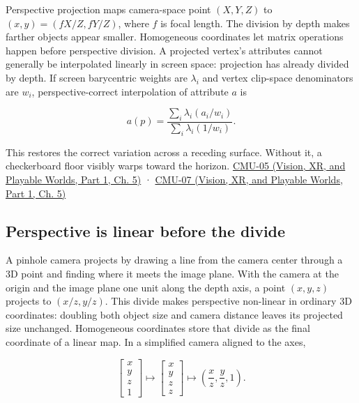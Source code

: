 Perspective projection maps camera-space point \((X,Y,Z)\) to \((x,y)=(fX/Z,fY/Z)\), where \(f\) is focal length. The division by depth makes farther objects appear smaller. Homogeneous coordinates let matrix operations happen before perspective division. A projected vertex's attributes cannot generally be interpolated linearly in screen space: projection has already divided by depth. If screen barycentric weights are \(\lambda_i\) and vertex clip-space denominators are \(w_i\), perspective-correct interpolation of attribute \(a\) is

\[
a(p)=\frac{\sum_i\lambda_i(a_i/w_i)}{\sum_i\lambda_i(1/w_i)}.
\]

This restores the correct variation across a receding surface. Without it, a checkerboard floor visibly warps toward the horizon. \href{../07-Vision-XR-and-Playable-Worlds-P01/main.pdf\#nameddest=04-visual-computing-ii-ch036-cmu-05---spatial-transformations}{CMU-05 (Vision, XR, and Playable Worlds, Part 1, Ch. 5)} · \href{../07-Vision-XR-and-Playable-Worlds-P01/main.pdf\#nameddest=04-visual-computing-ii-ch036-cmu-07---perspective-projection-and-texture-mapping}{CMU-07 (Vision, XR, and Playable Worlds, Part 1, Ch. 5)}

\subsection{Perspective is linear before the divide}\label{03-visual-computing-i-ch003-perspective-is-linear-before-the-divide}

\hypertarget{03-visual-computing-i-ch003-perspective-is-linear-before-the-divide}{}

A pinhole camera projects by drawing a line from the camera center through a 3D point and finding where it meets the image plane. With the camera at the origin and the image plane one unit along the depth axis, a point \((x,y,z)\) projects to \((x/z,y/z)\). This divide makes perspective non-linear in ordinary 3D coordinates: doubling both object size and camera distance leaves its projected size unchanged. Homogeneous coordinates store that divide as the final coordinate of a linear map. In a simplified camera aligned to the axes,

\[
\begin{bmatrix}x\\y\\z\\1\end{bmatrix}
\longmapsto
\begin{bmatrix}x\\y\\z\\z\end{bmatrix}
\longmapsto
\left(\frac{x}{z},\frac{y}{z},1\right).
\]

